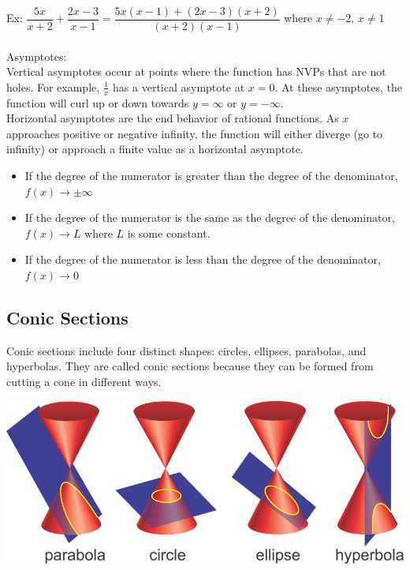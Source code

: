 \documentclass[11pt, fleqn]{article}
\begin{document}
Ex: $\dfrac{5x}{x+2}+\dfrac{2x-3}{x-1}=\dfrac{5x(x-1)+(2x-3)(x+2)}{(x+2)(x-1)}$ where $x\neq-2,\,x\neq1$\\
\\
Asymptotes:\\
Vertical asymptotes occur at points where the function has NVPs that are not holes. For example, $\frac{1}{x}$ has a vertical asymptote at $x=0$. At these asymptotes, the function will curl up or down towards $y=\infty$ or $y=-\infty$.\\
Horizontal asymptotes are the end behavior of rational functions. As $x$ approaches positive or negative infinity, the function will either diverge (go to infinity) or approach a finite value as a horizontal asymptote.
\begin{itemize}
    \item If the degree of the numerator is greater than the degree of the denominator, $f(x)\to\pm\infty$
    \item If the degree of the numerator is the same as the degree of the denominator, $f(x)\to L$ where $L$ is some constant.
    \item If the degree of the numerator is less than the degree of the denominator, $f(x)\to 0$
\end{itemize}









\subsection{Conic Sections}
Conic sections include four distinct shapes: circles, ellipses, parabolas, and hyperbolas. They are called conic sections because they can be formed from cutting a cone in different ways.\\
\centerline{\includegraphics[scale=0.5]{PreCalcPictures/ConicSections.png}}
\end{document}

